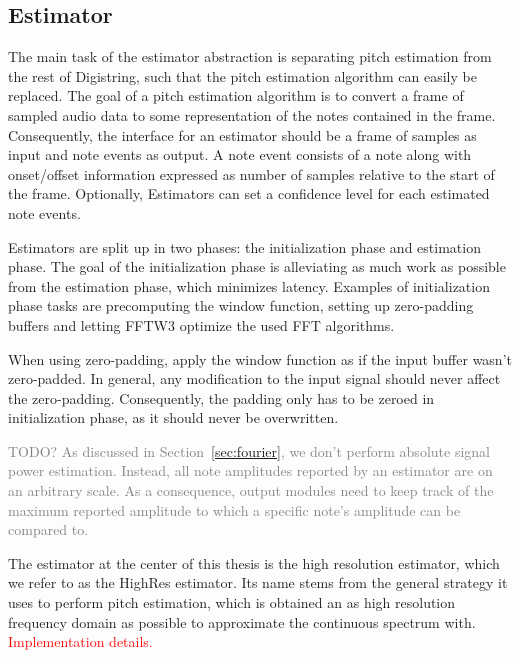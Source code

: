 \documentclass[a4paper,10pt,twocolumn]{article}
\begin{document}
\subsection{Estimator}
%
The main task of the estimator abstraction is separating pitch estimation from the rest of Digistring, such that the pitch estimation algorithm can easily be replaced. The goal of a pitch estimation algorithm is to convert a frame of sampled audio data to some representation of the notes contained in the frame. Consequently, the interface for an estimator should be a frame of samples as input and note events as output. A note event consists of a note along with onset/offset information expressed as number of samples relative to the start of the frame. Optionally, Estimators can set a confidence level for each estimated note events.

Estimators are split up in two phases: the initialization phase and estimation phase. The goal of the initialization phase is alleviating as much work as possible from the estimation phase, which minimizes latency. Examples of initialization phase tasks are precomputing the window function, setting up zero-padding buffers and letting FFTW3 optimize the used FFT algorithms.

When using zero-padding, apply the window function as if the input buffer wasn't zero-padded. In general, any modification to the input signal should never affect the zero-padding. Consequently, the padding only has to be zeroed in initialization phase, as it should never be overwritten.

\textcolor{gray}{TODO? As discussed in Section~\ref{sec:fourier}, we don't perform absolute signal power estimation. Instead, all note amplitudes reported by an estimator are on an arbitrary scale. As a consequence, output modules need to keep track of the maximum reported amplitude to which a specific note's amplitude can be compared to.}

The estimator at the center of this thesis is the high resolution estimator, which we refer to as the HighRes estimator. Its name stems from the general strategy it uses to perform pitch estimation, which is obtained an as high resolution frequency domain as possible to approximate the continuous spectrum with. \textcolor{red}{Implementation details.}
\end{document}
